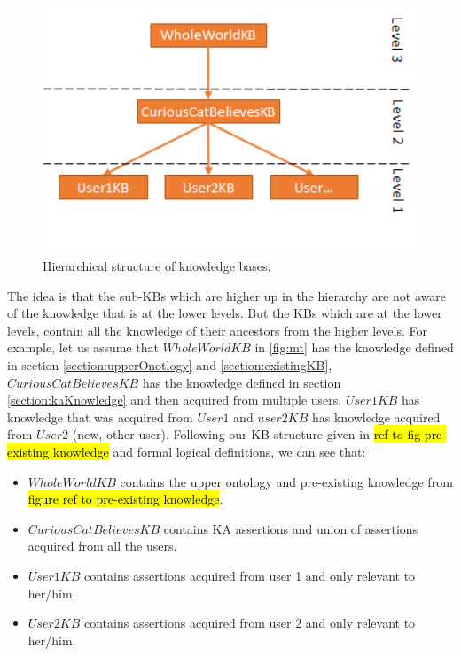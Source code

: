 \begin{figure}[H]
	\centering
		\includegraphics[width=1\textwidth]{figures/microtheories.png}
	\caption{Hierarchical structure of knowledge bases.}
	\label{fig:mt}
\end{figure}

The idea is that the sub-KBs which are higher up in the hierarchy are not aware
of the knowledge that is at the lower levels. But the KBs which are at the lower
levels, contain all the knowledge of their ancestors from the higher levels. 
For example,  let us assume that $WholeWorldKB$  in \autoref{fig:mt} has the 
knowledge defined in section \ref{section:upperOnotlogy} and 
\autoref{section:existingKB}, $CuriousCatBelievesKB$ has the knowledge defined
in section \autoref{section:kaKnowledge} and then acquired from multiple users. 
$User1KB$ has knowledge that was acquired from $User1$ and $user2KB$ has 
knowledge acquired from $User2$ (new, other user). Following our KB structure 
given in \hl{ref to fig pre-existing knowledge} and formal logical definitions, 
we can see that:
\begin{itemize}
\item $WholeWorldKB$ contains the upper ontology and pre-existing knowledge 
from \hl{figure ref to pre-existing knowledge}.
\item $CuriousCatBelievesKB$ contains KA assertions and union of assertions 
acquired from all the users.
\item $User1KB$ contains assertions acquired from user 1 and only relevant to 
her/him.
\item $User2KB$ contains assertions acquired from user 2 and only relevant to 
her/him.
\end{itemize}

